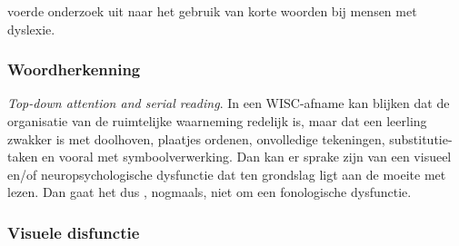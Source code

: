 \textcite{Rello2013} voerde onderzoek uit naar het gebruik van korte woorden bij mensen met dyslexie.

\subsubsection{Woordherkenning}









\textit{Top-down attention and serial reading}. In een WISC-afname kan blijken dat de organisatie van de ruimtelijke waarneming redelijk is, maar dat een leerling zwakker is met doolhoven, plaatjes ordenen, onvolledige tekeningen, substitutie-taken en vooral met symboolverwerking. Dan kan er sprake zijn van een visueel en/of neuropsychologische dysfunctie dat ten grondslag ligt aan de moeite met lezen. Dan gaat het dus , nogmaals, niet om een fonologische dysfunctie.

\subsubsection{Visuele disfunctie}

